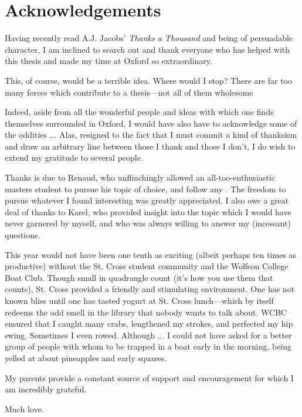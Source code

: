 \chapter*{Acknowledgements}

Having recently read A.J. Jacobs' \emph{Thanks a  Thousand} and  being of persuadable character, I am inclined to search out and thank everyone who has helped with this thesis and made my time at Oxford so extraordinary. 

This, of course, would be a terrible idea. Where would I stop? There are far too many forces which contribute to  a thesis---not  all of them wholesome

Indeed, aside from all the wonderful people  and ideas  with which one  finds themselves surrounded in Oxford,  I  would have also have to acknowledge some of the oddities  ... 
Alas, resigned to the fact  that I must commit a kind of thanksism  and draw  an arbitrary line between those I thank and  those I don't, I do wish to extend  my gratitude to several  people. 

Thanks is due to Renaud, who unflinchingly allowed an all-too-enthusiastic masters student to pursue his topic of choice, and follow any . The freedom to pursue whatever  I found interesting was  greatly appreciated. I also owe a great  deal of thanks to Karel,  who provided insight into the topic which I would  have never  garnered  by myself, and who  was  always willing to answer my (incessant) questions. 

This year would not have been one tenth as exciting (albeit perhaps ten times as productive) without the St. Cross student community and the Wolfson College Boat Club. Though small in quadrangle count (it's  how you use them  that counts), St. Cross provided a friendly and stimulating environment. One has not  known  bliss until one has tasted yogurt  at St. Cross lunch---which by itself redeems the odd smell in the library that nobody wants to talk about. 
WCBC ensured that I caught many crabs, lengthened  my strokes, and perfected my hip swing. Sometimes I even rowed. Although ... I could not have  asked for a  better group of people  with whom to be trapped in  a boat early in the morning, being yelled at about pineapples and early squares. 

My parents provide a constant source of support and encouragement for which I am  incredibly  grateful. 

Much love. 


